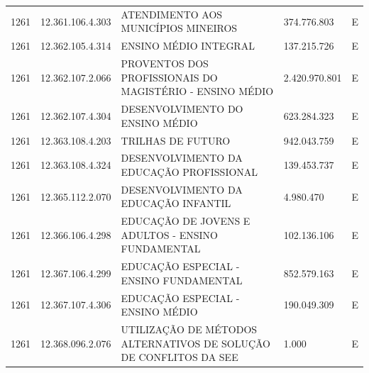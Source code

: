 \documentclass{article}
\begin{document}
\begin{longtable}[c]{m{1cm}|m{2cm}|m{10cm}|m{2cm}|m{1cm}}
\multicolumn{1}{C{1cm}|}{1261} & \multicolumn{1}{C{2cm}|}{12.361.106.4.303} & \multicolumn{1}{L{10cm}|}{ATENDIMENTO AOS MUNICÍPIOS MINEIROS} & \multicolumn{1}{R{2cm}|}{374.776.803} & \multicolumn{1}{C{1cm}}{E} \\
\multicolumn{1}{C{1cm}|}{1261} & \multicolumn{1}{C{2cm}|}{12.362.105.4.314} & \multicolumn{1}{L{10cm}|}{ENSINO MÉDIO INTEGRAL} & \multicolumn{1}{R{2cm}|}{137.215.726} & \multicolumn{1}{C{1cm}}{E} \\
\multicolumn{1}{C{1cm}|}{1261} & \multicolumn{1}{C{2cm}|}{12.362.107.2.066} & \multicolumn{1}{L{10cm}|}{PROVENTOS DOS PROFISSIONAIS DO MAGISTÉRIO - ENSINO MÉDIO} & \multicolumn{1}{R{2cm}|}{2.420.970.801} & \multicolumn{1}{C{1cm}}{E} \\
\multicolumn{1}{C{1cm}|}{1261} & \multicolumn{1}{C{2cm}|}{12.362.107.4.304} & \multicolumn{1}{L{10cm}|}{DESENVOLVIMENTO DO ENSINO MÉDIO} & \multicolumn{1}{R{2cm}|}{623.284.323} & \multicolumn{1}{C{1cm}}{E} \\
\multicolumn{1}{C{1cm}|}{1261} & \multicolumn{1}{C{2cm}|}{12.363.108.4.203} & \multicolumn{1}{L{10cm}|}{TRILHAS DE FUTURO} & \multicolumn{1}{R{2cm}|}{942.043.759} & \multicolumn{1}{C{1cm}}{E} \\
\multicolumn{1}{C{1cm}|}{1261} & \multicolumn{1}{C{2cm}|}{12.363.108.4.324} & \multicolumn{1}{L{10cm}|}{DESENVOLVIMENTO DA EDUCAÇÃO PROFISSIONAL} & \multicolumn{1}{R{2cm}|}{139.453.737} & \multicolumn{1}{C{1cm}}{E} \\
\multicolumn{1}{C{1cm}|}{1261} & \multicolumn{1}{C{2cm}|}{12.365.112.2.070} & \multicolumn{1}{L{10cm}|}{DESENVOLVIMENTO DA EDUCAÇÃO INFANTIL} & \multicolumn{1}{R{2cm}|}{4.980.470} & \multicolumn{1}{C{1cm}}{E} \\
\multicolumn{1}{C{1cm}|}{1261} & \multicolumn{1}{C{2cm}|}{12.366.106.4.298} & \multicolumn{1}{L{10cm}|}{EDUCAÇÃO DE JOVENS E ADULTOS - ENSINO FUNDAMENTAL} & \multicolumn{1}{R{2cm}|}{102.136.106} & \multicolumn{1}{C{1cm}}{E} \\
\multicolumn{1}{C{1cm}|}{1261} & \multicolumn{1}{C{2cm}|}{12.367.106.4.299} & \multicolumn{1}{L{10cm}|}{EDUCAÇÃO ESPECIAL - ENSINO FUNDAMENTAL} & \multicolumn{1}{R{2cm}|}{852.579.163} & \multicolumn{1}{C{1cm}}{E} \\
\multicolumn{1}{C{1cm}|}{1261} & \multicolumn{1}{C{2cm}|}{12.367.107.4.306} & \multicolumn{1}{L{10cm}|}{EDUCAÇÃO ESPECIAL - ENSINO MÉDIO} & \multicolumn{1}{R{2cm}|}{190.049.309} & \multicolumn{1}{C{1cm}}{E} \\
\multicolumn{1}{C{1cm}|}{1261} & \multicolumn{1}{C{2cm}|}{12.368.096.2.076} & \multicolumn{1}{L{10cm}|}{UTILIZAÇÃO DE MÉTODOS ALTERNATIVOS DE SOLUÇÃO DE CONFLITOS DA SEE} & \multicolumn{1}{R{2cm}|}{1.000} & \multicolumn{1}{C{1cm}}{E} \\

\end{longtable}
\end{document}
